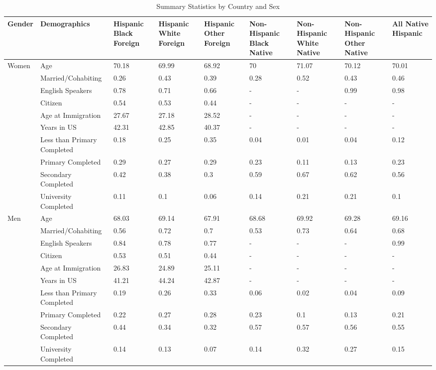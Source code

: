 \begin{table}[ht]
\centering
\caption{Summary Statistics by Country and Sex} 
\begingroup\small
\begin{tabular}{l|l|p{1.5cm}p{1.5cm}p{1.5cm}p{1.5cm}p{1.5cm}p{1.5cm}p{1.5cm}}
  \hline
Gender & Demographics & Hispanic Black Foreign & Hispanic White Foreign & Hispanic Other Foreign & Non-Hispanic Black Native & Non-Hispanic White Native & Non-Hispanic Other Native & All Native Hispanic \\ 
  \hline
Women & Age & 70.18 & 69.99 & 68.92 & 70 & 71.07 & 70.12 & 70.01 \\ 
   & Married/Cohabiting & 0.26 & 0.43 & 0.39 & 0.28 & 0.52 & 0.43 & 0.46 \\ 
   & English Speakers & 0.78 & 0.71 & 0.66 & - & - & 0.99 & 0.98 \\ 
   & Citizen & 0.54 & 0.53 & 0.44 & - & - & - & - \\ 
   & Age at Immigration & 27.67 & 27.18 & 28.52 & - & - & - & - \\ 
   & Years in US & 42.31 & 42.85 & 40.37 & - & - & - & - \\ 
   & Less than Primary Completed & 0.18 & 0.25 & 0.35 & 0.04 & 0.01 & 0.04 & 0.12 \\ 
   & Primary Completed & 0.29 & 0.27 & 0.29 & 0.23 & 0.11 & 0.13 & 0.23 \\ 
   & Secondary Completed & 0.42 & 0.38 & 0.3 & 0.59 & 0.67 & 0.62 & 0.56 \\ 
   & University Completed & 0.11 & 0.1 & 0.06 & 0.14 & 0.21 & 0.21 & 0.1 \\ 
  Men & Age & 68.03 & 69.14 & 67.91 & 68.68 & 69.92 & 69.28 & 69.16 \\ 
   & Married/Cohabiting & 0.56 & 0.72 & 0.7 & 0.53 & 0.73 & 0.64 & 0.68 \\ 
   & English Speakers & 0.84 & 0.78 & 0.77 & - & - & - & 0.99 \\ 
   & Citizen & 0.53 & 0.51 & 0.44 & - & - & - & - \\ 
   & Age at Immigration & 26.83 & 24.89 & 25.11 & - & - & - & - \\ 
   & Years in US & 41.21 & 44.24 & 42.87 & - & - & - & - \\ 
   & Less than Primary Completed & 0.19 & 0.26 & 0.33 & 0.06 & 0.02 & 0.04 & 0.09 \\ 
   & Primary Completed & 0.22 & 0.27 & 0.28 & 0.23 & 0.1 & 0.13 & 0.21 \\ 
   & Secondary Completed & 0.44 & 0.34 & 0.32 & 0.57 & 0.57 & 0.56 & 0.55 \\ 
   & University Completed & 0.14 & 0.13 & 0.07 & 0.14 & 0.32 & 0.27 & 0.15 \\ 
   \hline
\end{tabular}
\endgroup
\end{table}
